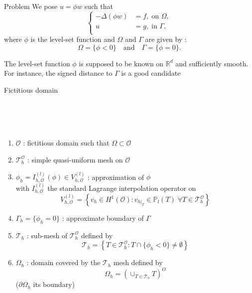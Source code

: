 \documentclass[compress,10pt,xcolor={table,dvipsnames},t]{beamer}
\begin{document}
	\begin{frame}{Problem}
		We pose $u=\phi w$ such that
		$$\left\{\begin{aligned}
			-\Delta (\phi w) &= f, \; \text{on } \Omega, \\
			u&=g, \; \text{in } \Gamma, \\
		\end{aligned}\right.$$
		where $\phi$ is the level-set function and $\Omega$ and $\Gamma$ are given by :
		$$
		\Omega=\{\phi < 0\} \quad \text{and} \quad \Gamma=\{\phi = 0\}.$$
		\begin{center}
		\end{center}
		The level-set function $\phi$ is supposed to be known on $\mathbb{R}^d$ and sufficiently smooth. \\
		For instance, the signed distance to $\Gamma$ is a good candidate
	\end{frame}
	
	\begin{frame}{Fictitious domain}
		\begin{minipage}{0.39\linewidth}
			\centering
			 \\ \tiny \; \\
			 \qquad \qquad \qquad \qquad  \\
			\tiny {}
		\end{minipage}
		\begin{minipage}{0.6\linewidth}
			\begin{enumerate}[\ding{217}]
				\item $\mathcal{O}$ : fictitious domain such that $\Omega\subset\mathcal{O}$
				\item $\mathcal{T}_h^\mathcal{O}$ : simple quasi-uniform mesh on $\mathcal{O}$
				\item $\phi_h=I_{h,\mathcal{O}}^{(l)}(\phi)\in V_{h,\mathcal{O}}^{(l)}$ : approximation of $\phi$ \\ 
				with $I_{h,\mathcal{O}}^{(l)}$ the standard Lagrange interpolation operator on
				$$V_{h,\mathcal{O}}^{(l)}=\left\{v_h\in H^1(\mathcal{O}):v_{h|_T}\in\mathbb{P}_l(T) \;  \forall T\in\mathcal{T}_h^\mathcal{O}\right\}$$
				\item $\Gamma_h=\{\phi_h=0\}$ : approximate boundary of $\Gamma$
				\item $\mathcal{T}_h$ : sub-mesh of $\mathcal{T}_h^\mathcal{O}$ defined by
				$$\mathcal{T}_h=\left\{T\in \mathcal{T}_h^\mathcal{O}:T\cap\{\phi_h<0\}\ne\emptyset\right\}$$
				\item $\Omega_h$ : domain covered by the $\mathcal{T}_h$ mesh defined by
				$$\Omega_h=\left(\cup_{T\in\mathcal{T}_h}T\right)^O$$
				($\partial\Omega_h$ its boundary)
			\end{enumerate}			
		\end{minipage}
	\end{frame}
	
\end{document}
